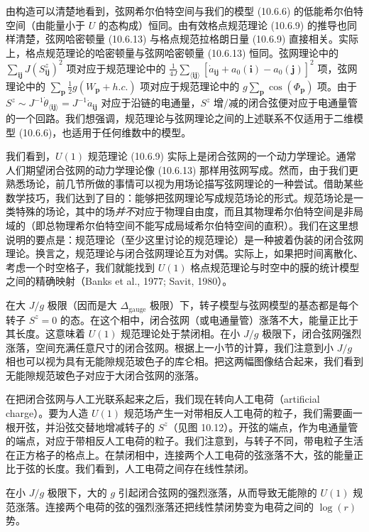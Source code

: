 由构造可以清楚地看到，弦网希尔伯特空间与我们的模型 (10.6.6) 的低能希尔伯特空间（由能量小于 $U$ 的态构成）恒同。由有效格点规范理论 (10.6.9) 的推导也同样清楚，弦网哈密顿量 (10.6.13) 与格点规范拉格朗日量 (10.6.9) 直接相关。实际上，格点规范理论的哈密顿量与弦网哈密顿量 (10.6.13) 恒同。弦网理论中的 $\sum_{\pmb i\pmb j}J(S^{z}_{\pmb i\pmb j})^{2}$ 项对应于规范理论中的 $\frac{1}{4J}\sum_{\langle\pmb i\pmb j\rangle}[\dot{a}_{\pmb i\pmb j}+a_0(\pmb i)-a_0(\pmb j)]^{2}$ 项，弦网理论中的 $\sum_{\pmb p}\frac{1}{2}g(W_{\pmb p}+h.c.)$ 项对应于规范理论中的 $g\sum_{\pmb p}\cos(\Phi_{\pmb p})$ 项。由于 $S^{z}\sim J^{-1}\dot{\theta}_{\langle\pmb i\pmb j\rangle}=J^{-1}\dot{a}_{\pmb i\pmb j}$ 对应于沿链的电通量，$S^{z}$ 增/减的闭合弦便对应于电通量管的一个回路。我们想强调，规范理论与弦网理论之间的上述联系不仅适用于二维模型 (10.6.6)，也适用于任何维数中的模型。

我们看到，$U(1)$ 规范理论 (10.6.9) 实际上是闭合弦网的一个动力学理论。通常人们期望闭合弦网的动力学理论像 (10.6.13) 那样用弦网写成。然而，由于我们更熟悉场论，前几节所做的事情可以视为用场论描写弦网理论的一种尝试。借助某些数学技巧，我们达到了目的：能够把弦网理论写成规范场论的形式。规范场论是一类特殊的场论，其中的场\emph{并不}对应于物理自由度，而且其物理希尔伯特空间是非局域的（即总物理希尔伯特空间不能写成局域希尔伯特空间的直积）。我们在这里想说明的要点是：规范理论（至少这里讨论的规范理论）是一种披着伪装的闭合弦网理论。换言之，规范理论与闭合弦网理论互为对偶。实际上，如果把时间离散化、考虑一个时空格子，我们就能找到 $U(1)$ 格点规范理论与时空中的膜的统计模型之间的精确映射（Banks et al., 1977; Savit, 1980）。

在大 $J/g$ 极限（因而是大 $\Delta_{\mathrm{gauge}}$ 极限）下，转子模型与弦网模型的基态都是每个转子 $S^{z}=0$ 的态。在这个相中，闭合弦网（或电通量管）涨落不大，能量正比于其长度。这意味着 $U(1)$ 规范理论处于禁闭相。在小 $J/g$ 极限下，闭合弦网强烈涨落，空间充满任意尺寸的闭合弦网。根据上一小节的计算，我们注意到小 $J/g$ 相也可以视为具有无能隙规范玻色子的库仑相。把这两幅图像结合起来，我们看到无能隙规范玻色子对应于大闭合弦网的涨落。

在把闭合弦网与人工光联系起来之后，我们现在转向人工电荷（artificial charge）。要为人造 $U(1)$ 规范场产生一对带相反人工电荷的粒子，我们需要画一根开弦，并沿弦交替地增减转子的 $S^{z}$（见图 10.12）。开弦的端点，作为电通量管的端点，对应于带相反人工电荷的粒子。我们注意到，与转子不同，带电粒子生活在正方格子的格点上。在禁闭相中，连接两个人工电荷的弦涨落不大，弦的能量正比于弦的长度。我们看到，人工电荷之间存在线性禁闭。

在小 $J/g$ 极限下，大的 $g$ 引起闭合弦网的强烈涨落，从而导致无能隙的 $U(1)$ 规范涨落。连接两个电荷的弦的强烈涨落还把线性禁闭势变为电荷之间的 $\log(r)$ 势。

